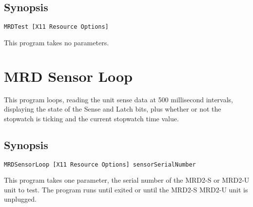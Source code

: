 \subsection{Synopsis}

\begin{verbatim}
MRDTest [X11 Resource Options]
\end{verbatim}

This program takes no parameters.

\section{MRD Sensor Loop}

This program loops, reading the unit sense data at 500 millisecond
intervals, displaying the state of the Sense and Latch bits, plus
whether or not the stopwatch is ticking and the current stopwatch time
value. 

\subsection{Synopsis}

\begin{verbatim}
MRDSensorLoop [X11 Resource Options] sensorSerialNumber
\end{verbatim}

This program takes one parameter, the serial number of the MRD2-S or
MRD2-U unit to test.  The program runs until exited or until the MRD2-S
MRD2-U unit is unplugged.

